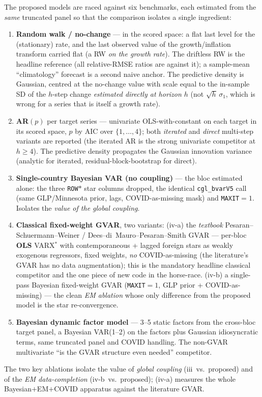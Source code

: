 \documentclass[11pt]{article}
\theoremstyle{definition}
\theoremstyle{remark}
\begin{document}
The proposed models are raced against six benchmarks, each estimated from
the \emph{same} truncated panel so that the comparison isolates a single
ingredient:
\begin{enumerate}[label=(\roman*)]
  \item \textbf{Random walk / no-change} --- in the scored space: a flat
    last level for the (stationary) rate, and the last observed value of
    the growth/inflation transform carried flat (a RW \emph{on the growth
    rate}). The driftless RW is the headline reference (all relative-RMSE
    ratios are against it); a sample-mean ``climatology'' forecast is a
    second naive anchor. The predictive density is Gaussian, centred at
    the no-change value with scale equal to the in-sample SD of the
    $h$-step change \emph{estimated directly at horizon $h$} (not
    $\sqrt h\,\sigma_1$, which is wrong for a series that is itself a
    growth rate).
  \item \textbf{AR$(p)$} per target series --- univariate OLS-with-constant
    on each target in its scored space, $p$ by AIC over $\{1,\dots,4\}$;
    both \emph{iterated} and \emph{direct}
    \citep{MarcellinoStockWatson2006} multi-step variants are reported
    (the iterated AR is the strong univariate competitor at $h\ge4$). The
    predictive density propagates the Gaussian innovation variance
    (analytic for iterated, residual-block-bootstrap for direct).
  \item \textbf{Single-country Bayesian VAR (no coupling)} --- the bloc
    estimated alone: the three \texttt{ROW$*$} star columns dropped, the
    identical \texttt{cgl\_bvarV5} call (same GLP/Minnesota prior, lags,
    COVID-as-missing mask) and \texttt{MAXIT}$=1$. Isolates the
    \emph{value of the global coupling}.
  \item \textbf{Classical fixed-weight GVAR}, two variants:
    (iv-a) the \emph{textbook} Pesaran--Schuermann--Weiner /
    Dees--di~Mauro--Pesaran--Smith GVAR
    \citep{PesaranSchuermannWeiner2004,DeesDiMauroPesaranSmith2007} ---
    per-bloc \textbf{OLS} VARX$^*$ with contemporaneous + lagged foreign
    stars as weakly exogenous regressors, fixed weights, \emph{no}
    COVID-as-missing (the literature's GVAR has no data augmentation);
    this is the mandatory headline classical competitor and the one piece
    of new code in the horse-race. (iv-b) a single-pass Bayesian
    fixed-weight GVAR (\texttt{MAXIT}$=1$, GLP prior + COVID-as-missing) ---
    the clean \emph{EM ablation} whose only difference from the proposed
    model is the star re-convergence.
  \item \textbf{Bayesian dynamic factor model} --- 3--5 static factors
    from the cross-bloc target panel, a Bayesian VAR(1--2) on the factors
    plus Gaussian idiosyncratic terms, same truncated panel and COVID
    handling. The non-GVAR multivariate ``is the GVAR structure even
    needed'' competitor.
\end{enumerate}
The two key ablations isolate the value of \emph{global coupling}
(iii~vs.\ proposed) and of the \emph{EM data-completion} (iv-b~vs.\
proposed); (iv-a) measures the whole Bayesian$+$EM$+$COVID apparatus
against the literature GVAR.
\end{document}
